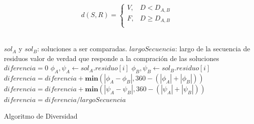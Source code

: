 \begin{equation}
    \label{eq:diversity}
    d(S,R) =
    \left\{
        \begin{array}{ll}
            V, & D <  D_{A,B}   \\
            F, & D \geq D_{A,B} \\
        \end{array}
    \right.
\end{equation}
\\[25pt]
\begin{algorithm}[H]
	\begin{algorithmic}[1]
		\REQUIRE $sol_{A}$ y $sol_{B}$: soluciones a ser comparadas. $largoSecuencia$: largo de la secuencia de residuos
		\ENSURE valor de verdad que responde a la compración de las soluciones
		\STATE $diferencia=0$
			\STATE $\phi_{A},\psi_{A} \gets sol_{A}.residuo[i]$
			\STATE $\phi_{B},\psi_{B} \gets sol_{B}.residuo[i]$
			\STATE $diferencia = diferencia + \textbf{min}(|\phi_{A}-\phi_{B}|,360-(|\phi_{A}|+|\phi_{B}|))$
			\STATE $diferencia = diferencia + \textbf{min}(|\psi_{A}-\psi_{B}|,360-(|\psi_{A}|+|\psi_{B}|))$
		\ENDFOR
		\STATE $diferencia = diferencia/largoSecuencia$
		    \RETURN \TRUE
		\ELSE
		    \RETURN \FALSE
		\ENDIF
	\end{algorithmic}
	\caption{Algoritmo de Diversidad}
	\label{alg:memetico-diversidad}
\end{algorithm}

